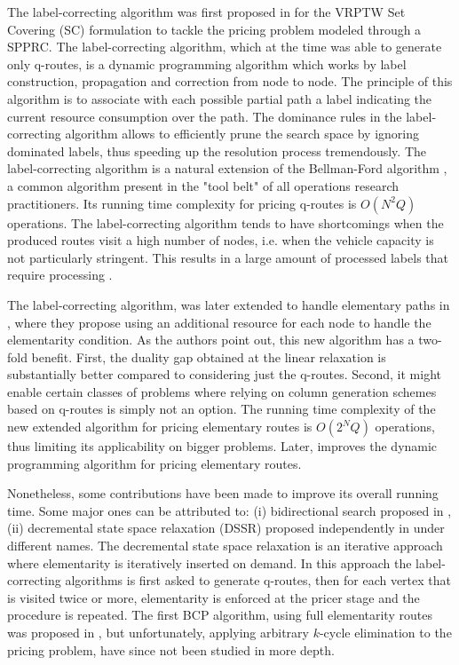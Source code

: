 The label-correcting algorithm was first proposed in \textcite{desrochers1992}
for the VRPTW Set Covering (SC) formulation
to tackle the pricing problem modeled through a SPPRC.
The label-correcting algorithm, which at the time was able to generate only q-routes,
is a dynamic programming algorithm
which works by label construction, propagation and correction from node to node.
The principle of this algorithm is to associate with each possible partial
path a label indicating the current resource consumption over the path.
The dominance rules in the label-correcting algorithm allows
to efficiently prune the search space by ignoring dominated labels, thus speeding
up the resolution process tremendously.
The label-correcting algorithm
is a natural extension of the Bellman-Ford algorithm \parencite{bellman1958, fordjr1956},
a common algorithm present in the "tool belt" of all operations research practitioners.
Its running time complexity for pricing q-routes is $O(N^2 Q)$ operations.
The label-correcting algorithm tends to have shortcomings when the
produced routes visit a high number of nodes,
i.e. when the vehicle capacity is not particularly stringent.
This results in a large amount of processed labels that require processing \parencite{jepsen2008branchandcut}.

The label-correcting algorithm, was later extended to handle
elementary paths in \textcite{feillet2004},
where they propose using an additional resource for each node
to handle the elementarity condition.
As the authors point out, this new algorithm has a two-fold benefit.
First, the duality gap obtained at the linear relaxation is substantially better
compared to considering just the q-routes.
Second, it might enable certain classes of problems where relying
on column generation schemes based on q-routes is simply not an option.
The running time complexity of the new extended algorithm for pricing elementary routes
is $O(2^N Q)$ operations,
thus limiting its applicability on bigger problems.
Later, \textcite{righini2006} improves the dynamic programming
algorithm for pricing elementary routes.

Nonetheless, some contributions have been made to improve its overall running time.
Some major ones can be attributed to:
(i) bidirectional search proposed in \textcite{righini2006},
(ii) decremental state space relaxation (DSSR) proposed independently in
\textcite{boland2006, righini2008} under different names.
The decremental state space relaxation is an iterative
approach where elementarity is iteratively inserted on demand.
In this approach the label-correcting algorithms
is first asked to generate q-routes, then for each vertex that is visited
twice or more, elementarity is enforced at the pricer stage
and the procedure is repeated.
The first BCP algorithm, using full elementarity routes
was proposed in \cite{chabrier2006}, but unfortunately,
applying arbitrary $k$-cycle elimination to the pricing problem,
have since not been studied in more depth.

